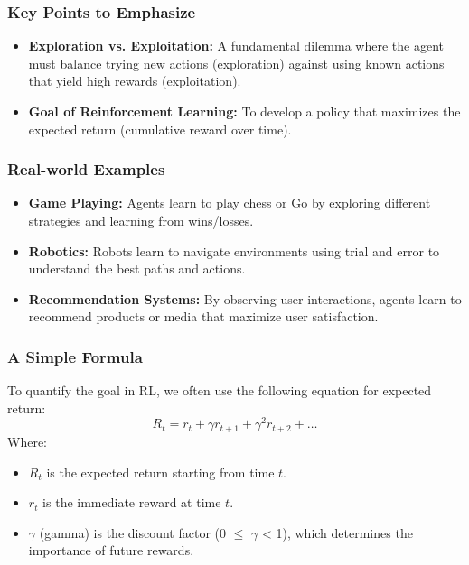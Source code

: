 \documentclass[aspectratio=169]{beamer}
\begin{document}
\begin{frame}[fragile]
    \frametitle{Key Points to Emphasize}

    \begin{itemize}
        \item \textbf{Exploration vs. Exploitation:} A fundamental dilemma where the agent must balance trying new actions (exploration) against using known actions that yield high rewards (exploitation).
        \item \textbf{Goal of Reinforcement Learning:} To develop a policy that maximizes the expected return (cumulative reward over time).
    \end{itemize}
\end{frame}

\begin{frame}[fragile]
    \frametitle{Real-world Examples}

    \begin{itemize}
        \item \textbf{Game Playing:} Agents learn to play chess or Go by exploring different strategies and learning from wins/losses.
        \item \textbf{Robotics:} Robots learn to navigate environments using trial and error to understand the best paths and actions.
        \item \textbf{Recommendation Systems:} By observing user interactions, agents learn to recommend products or media that maximize user satisfaction.
    \end{itemize}
\end{frame}

\begin{frame}[fragile]
    \frametitle{A Simple Formula}

    To quantify the goal in RL, we often use the following equation for expected return:
    \begin{equation}
        R_t = r_t + \gamma r_{t+1} + \gamma^2 r_{t+2} + \ldots 
    \end{equation}
    Where:
    \begin{itemize}
        \item $R_t$ is the expected return starting from time $t$.
        \item $r_t$ is the immediate reward at time $t$.
        \item $\gamma$ (gamma) is the discount factor (0 $\leq$ $\gamma$ < 1), which determines the importance of future rewards.
    \end{itemize}
\end{frame}
\end{document}
